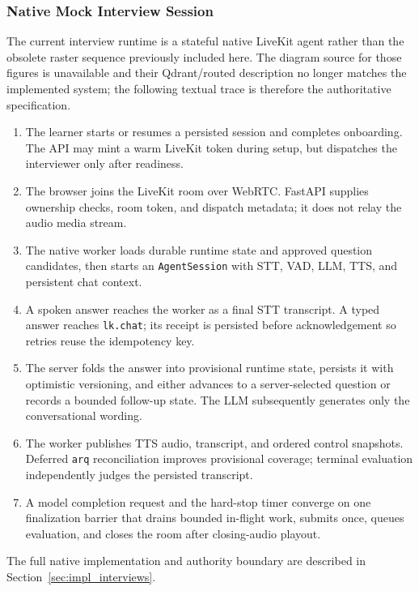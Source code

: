 \subsubsection{Native Mock Interview Session}
The current interview runtime is a stateful native LiveKit agent rather than the obsolete raster sequence previously included here. The diagram source for those figures is unavailable and their Qdrant/routed description no longer matches the implemented system; the following textual trace is therefore the authoritative specification.

\begin{enumerate}
    \item The learner starts or resumes a persisted session and completes onboarding. The API may mint a warm LiveKit token during setup, but dispatches the interviewer only after readiness.
    \item The browser joins the LiveKit room over WebRTC. FastAPI supplies ownership checks, room token, and dispatch metadata; it does not relay the audio media stream.
    \item The native worker loads durable runtime state and approved question candidates, then starts an \texttt{AgentSession} with STT, VAD, LLM, TTS, and persistent chat context.
    \item A spoken answer reaches the worker as a final STT transcript. A typed answer reaches \texttt{lk.chat}; its receipt is persisted before acknowledgement so retries reuse the idempotency key.
    \item The server folds the answer into provisional runtime state, persists it with optimistic versioning, and either advances to a server-selected question or records a bounded follow-up state. The LLM subsequently generates only the conversational wording.
    \item The worker publishes TTS audio, transcript, and ordered control snapshots. Deferred \texttt{arq} reconciliation improves provisional coverage; terminal evaluation independently judges the persisted transcript.
    \item A model completion request and the hard-stop timer converge on one finalization barrier that drains bounded in-flight work, submits once, queues evaluation, and closes the room after closing-audio playout.
\end{enumerate}

The full native implementation and authority boundary are described in Section~\ref{sec:impl_interviews}.